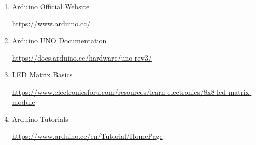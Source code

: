 \begin{enumerate}

\item Arduino Official Website

\url{https://www.arduino.cc/}

\item Arduino UNO Documentation

\url{https://docs.arduino.cc/hardware/uno-rev3/}

\item LED Matrix Basics

\url{https://www.electronicsforu.com/resources/learn-electronics/8x8-led-matrix-module}

\item Arduino Tutorials

\url{https://www.arduino.cc/en/Tutorial/HomePage}

\end{enumerate}